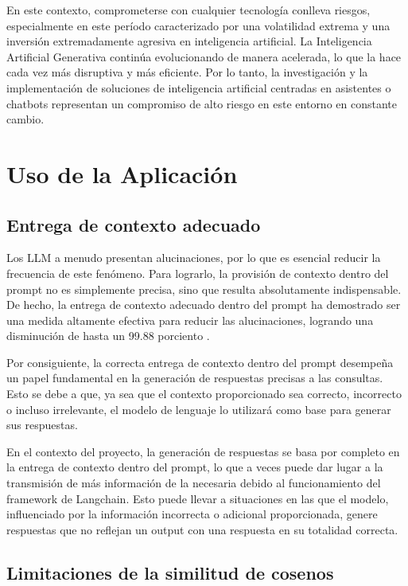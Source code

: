 En este contexto, comprometerse con cualquier tecnología conlleva riesgos, especialmente en este período caracterizado por una 
volatilidad extrema y una inversión extremadamente agresiva en inteligencia artificial. La Inteligencia Artificial Generativa 
continúa evolucionando de manera acelerada, lo que la hace cada vez más disruptiva y más eficiente. Por lo tanto, la investigación 
y la implementación de soluciones de inteligencia artificial centradas en asistentes o chatbots representan un compromiso de alto 
riesgo en este entorno en constante cambio.

\section{Uso de la Aplicación}

\subsection{Entrega de contexto adecuado}

Los LLM a menudo presentan alucinaciones, por lo que es esencial reducir la frecuencia de este fenómeno. 
Para lograrlo, la provisión de contexto dentro del prompt no es simplemente precisa, sino que resulta 
absolutamente indispensable. De hecho, la entrega de contexto adecuado dentro del prompt ha demostrado 
ser una medida altamente efectiva para reducir las alucinaciones, logrando una disminución de hasta un 
99.88 porciento \cite{riego1}.

Por consiguiente, la correcta entrega de contexto dentro del prompt desempeña un papel fundamental en 
la generación de respuestas precisas a las consultas. Esto se debe a que, ya sea que el contexto 
proporcionado sea correcto, incorrecto o incluso irrelevante, el modelo de lenguaje lo utilizará como base 
para generar sus respuestas.

En el contexto del proyecto, la generación de respuestas se basa por completo en la entrega de contexto 
dentro del prompt, lo que a veces puede dar lugar a la transmisión de más información de la necesaria 
debido al funcionamiento del framework de Langchain. Esto puede llevar a situaciones en las que el modelo, 
influenciado por la información incorrecta o adicional proporcionada, genere respuestas que no reflejan 
un output con una respuesta en su totalidad correcta.

\subsection{Limitaciones de la similitud de cosenos}

